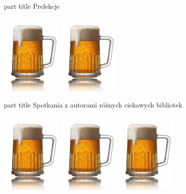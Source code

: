\documentclass{beamer}
\newcommand{\mybox}[1]{%
    \begin{centering}
    \vspace{1em}\par
        \begin{beamercolorbox}[rounded=true,sep=4pt,center]{part title}
           \huge #1
        \end{beamercolorbox}
    \end{centering}
}
\begin{document}
\begin{frame}[plain]
\mybox{Prelekcje}
\vspace{0.5cm}
\includegraphics[width=3cm]{piwo.png}
\includegraphics[width=3cm]{piwo.png}
\end{frame}
\begin{frame}[plain]
\mybox{Spotkania z autorami różnych ciekawych bibliotek}
\vspace{0.5cm}
\includegraphics[width=3cm]{piwo.png}
\includegraphics[width=3cm]{piwo.png}
\includegraphics[width=3cm]{piwo.png}
\end{frame}
\end{document}
